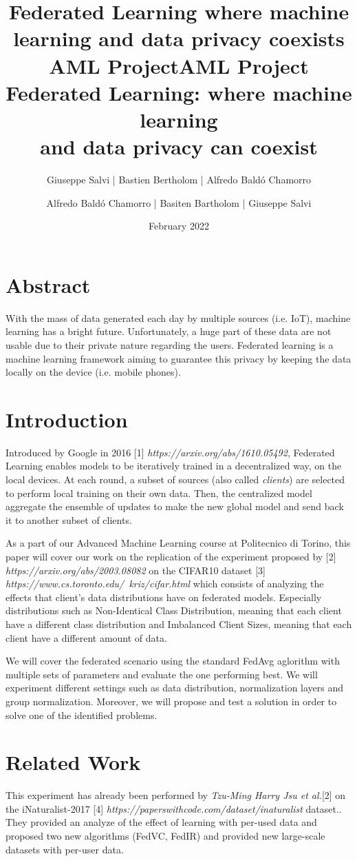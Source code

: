 \documentclass[twocolumn]{article}
\title{Federated Learning where machine learning and data privacy coexists
\\AML Project}
\author{Giuseppe Salvi |
Bastien Bertholom |
Alfredo Baldó Chamorro}
\title{AML Project
\\Federated Learning: where machine learning \\and data privacy can coexist
}
\author{
Alfredo Baldó Chamorro | 
Basiten Bartholom |
Giuseppe Salvi
}
\date{February 2022}
\begin{document}
\maketitle

\section{Abstract}
With the mass of data generated each day by multiple sources (i.e. IoT), machine learning has a bright future. Unfortunately, a huge part of these data are not usable due to their private nature regarding the users. Federated learning is a machine learning framework aiming to guarantee this privacy by keeping the data locally on the device (i.e. mobile phones).
\section{Introduction} %

Introduced by Google in 2016 [1] \emph{https://arxiv.org/abs/1610.05492}, Federated Learning enables models to be iteratively trained in a decentralized way, on the local devices. At each round, a subset of sources (also called \emph{clients}) are selected to perform local training on their own data. Then, the centralized model aggregate the ensemble of updates to make the new global model and send back it to another subset of clients. 

As a part of our Advanced Machine Learning course at Politecnico di Torino, this paper will cover our work on the replication of the experiment proposed by [2] \emph{https://arxiv.org/abs/2003.08082} on the CIFAR10 dataset [3] \emph{https://www.cs.toronto.edu/~kriz/cifar.html} which consists of analyzing the effects that client's data distributions have on federated models. Especially distributions such as Non-Identical Class Distribution, meaning that each client have a different class distribution and Imbalanced Client Sizes, meaning that each client have a different amount of data. 

We will cover the federated scenario using the standard FedAvg aglorithm with multiple sets of parameters and evaluate the one performing best. We will experiment different settings such as data distribution, normalization layers and group normalization. Moreover, we will propose and test a solution in order to solve one of the identified problems.

\section{Related Work} %
This experiment has already been performed by \emph{Tzu-Ming Harry Jsu et al.}[2]  on the iNaturalist-2017 [4] \emph{https://paperswithcode.com/dataset/inaturalist} dataset.. They provided an analyze of the effect of learning with per-used data and proposed two new algorithms (FedVC, FedIR) and provided new large-scale datasets with per-user data.
\end{document}
